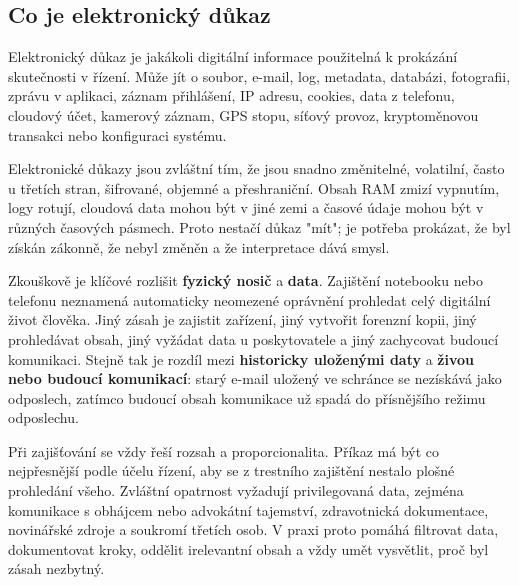 \subsection*{Co je elektronický důkaz}
Elektronický důkaz je jakákoli digitální informace použitelná k prokázání skutečnosti v řízení. Může jít o soubor, e-mail, log, metadata, databázi, fotografii, zprávu v aplikaci, záznam přihlášení, IP adresu, cookies, data z telefonu, cloudový účet, kamerový záznam, GPS stopu, síťový provoz, kryptoměnovou transakci nebo konfiguraci systému.

Elektronické důkazy jsou zvláštní tím, že jsou snadno změnitelné, volatilní, často u třetích stran, šifrované, objemné a přeshraniční. Obsah RAM zmizí vypnutím, logy rotují, cloudová data mohou být v jiné zemi a časové údaje mohou být v různých časových pásmech. Proto nestačí důkaz "mít"; je potřeba prokázat, že byl získán zákonně, že nebyl změněn a že interpretace dává smysl.

Zkouškově je klíčové rozlišit \textbf{fyzický nosič} a \textbf{data}. Zajištění notebooku nebo telefonu neznamená automaticky neomezené oprávnění prohledat celý digitální život člověka. Jiný zásah je zajistit zařízení, jiný vytvořit forenzní kopii, jiný prohledávat obsah, jiný vyžádat data u poskytovatele a jiný zachycovat budoucí komunikaci. Stejně tak je rozdíl mezi \textbf{historicky uloženými daty} a \textbf{živou nebo budoucí komunikací}: starý e-mail uložený ve schránce se nezískává jako odposlech, zatímco budoucí obsah komunikace už spadá do přísnějšího režimu odposlechu.

Při zajišťování se vždy řeší rozsah a proporcionalita. Příkaz má být co nejpřesnější podle účelu řízení, aby se z trestního zajištění nestalo plošné prohledání všeho. Zvláštní opatrnost vyžadují privilegovaná data, zejména komunikace s obhájcem nebo advokátní tajemství, zdravotnická dokumentace, novinářské zdroje a soukromí třetích osob. V praxi proto pomáhá filtrovat data, dokumentovat kroky, oddělit irelevantní obsah a vždy umět vysvětlit, proč byl zásah nezbytný.


